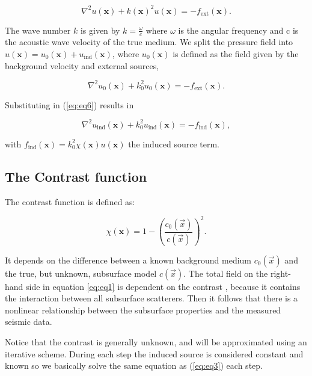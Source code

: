 \documentclass[10pt,a4paper]{article}
\begin{document}
\begin{equation} \label{eq:eq5}
\nabla^2 u(\mathbf{x}) + k(\mathbf{x})^2 u(\mathbf{x}) = -f_{\text{ext}}(\mathbf{x}).
\end{equation} 

The wave number $k$ is given by $k = \frac{\omega}{c}$ where $\omega$ is the angular frequency and c is the acoustic wave velocity of the true medium.  We split the pressure field into $u(\mathbf{x}) = u_0(\mathbf{x}) + u_{\text{ind}}(\mathbf{x})$, where $u_0(\mathbf{x})$ is defined as the field given by the background velocity and external sources,

\begin{equation} \label{eq:eq6}
\nabla^2 u_0(\mathbf{x}) + k_0^2 u_0(\mathbf{x}) = -f_{\text{ext}}(\mathbf{x}).
\end{equation} 

Substituting in (\ref{eq:eq6}) results in

\begin{equation} \label{eq:eq7}
\nabla^2 u_\text{ind}(\mathbf{x}) + k_0^2 u_\text{ind}(\mathbf{x}) = -f_\text{ind}(\mathbf{x}),
\end{equation} 

with $f_\text{ind}(\mathbf{x}) = k_0^2 \chi(\mathbf{x}) u(\mathbf{x})$ the induced source term.


\subsection{The Contrast function}

The contrast function is defined as: 

\begin{equation} \label{eq:eq8}\chi(\mathbf{x}) = 1 - \left(\frac{c_0(\vec{x})}{c(\vec{x})} \right)^2. \end{equation} 

It depends on the difference between a known background medium $c_\text{0}(\vec{x})$ and the true, but unknown, subsurface model $c(\vec{x})$. The total field on the right-hand side in equation \ref{eq:eq1} is dependent on the contrast , because it contains the interaction between all subsurface scatterers. Then it follows that there is a nonlinear relationship between the subsurface properties and the measured seismic data.

Notice that the contrast is generally unknown, and will be approximated using an iterative scheme. During each step the induced source is considered constant and known so we basically solve the same equation as (\ref{eq:eq3}) each step.
\end{document}
